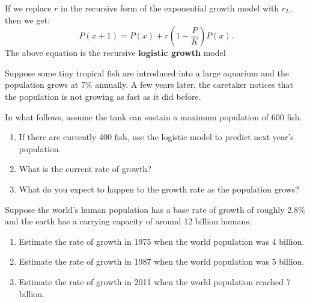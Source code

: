 If we replace \(r\) in the recursive form of the exponential growth
model with \(r_{L}\), then we get:
\begin{equation}
  \label{eq:logistic-growth-model}
  P(x+1) = P(x) + r \left( 1 - \frac{P}{K} \right) P(x).
\end{equation}
The above equation is the recursive \textbf{logistic growth} model
\newpage

\begin{exercise}
  Suppose some tiny tropical fish are introduced into a large aquarium
  and the population grows at 7\% annually. A few years later, the
  caretaker notices that the population is not growing as fast as it
  did before.

  In what follows, assume the tank can sustain a maximum population of
  600 fish.

  \begin{enumerate}
  \item If there are currently 400 fish, use the logistic model to
    predict next year's population.



  \item What is the current rate of growth?


  \item What do you expect to happen to the growth rate as the
    population grows?

  \end{enumerate}
\end{exercise}

\begin{exercise}
  Suppose the world's human population has a base rate of growth of
  roughly 2.8\% and the earth has a carrying capacity of around 12
  billion humans.

  \begin{enumerate}
  \item Estimate the rate of growth in 1975 when the world population
    was 4 billion.


  \item Estimate the rate of growth in 1987 when the world population
    was 5 billion.


  \item Estimate the rate of growth in 2011 when the world population
    reached 7 billion.
  \end{enumerate}
\end{exercise}


